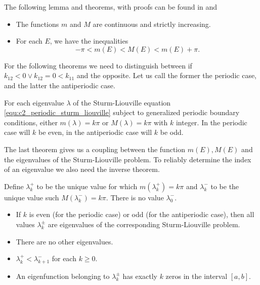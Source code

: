 The following lemma and theorems, with proofs can be found in \cite{binding_prufer_2012} and \cite{binding_prufer_2013a}
\begin{lemma}\label{lem:c2_periodic_m_inequality}\hfill
    \begin{itemize}
        \item The functions $m$ and $M$ are continuous and strictly increasing.
        \item For each $E$, we have the inequalities
              $$
                  -\pi < m(E) < M(E) < m(E) + \pi\text{.}
              $$
    \end{itemize}
\end{lemma}

For the following theorems we need to distinguish between if $k_{12} < 0 \lor k_{12} = 0 < k_{11}$ and the opposite. Let us call the former the periodic case, and the latter the antiperiodic case.

\begin{theorem}
    For each eigenvalue $\lambda$ of the Sturm-Liouville equation \eqref{equ:c2_periodic_sturm_liouville} subject to generalized periodic boundary conditions, either $m(\lambda) = k\pi$ or $M(\lambda) = k\pi$ with $k$ integer. In the periodic case will $k$ be even, in the antiperiodic case will $k$ be odd.
\end{theorem}

The last theorem gives us a coupling between the function $m(E), M(E)$ and the eigenvalues of the Sturm-Liouville problem. To reliably determine the index of an eigenvalue we also need the inverse theorem.

\begin{theorem}\label{the:c2_prufer_periodic_index}
    Define $\lambda_k^{+}$ to be the unique value for which $m(\lambda_k^{+}) = k\pi$ and $\lambda_k^{-}$ to be the unique value such $M(\lambda_k^{-}) = k\pi$. There is no value $\lambda_0^{-}$.
    \begin{itemize}
        \item If $k$ is even (for the periodic case) or odd (for the antiperiodic case), then all values $\lambda^{\pm}_k$ are eigenvalues of the corresponding Sturm-Liouville problem.
        \item There are no other eigenvalues.
        \item $\lambda_k^{+} < \lambda_{k+1}^{-}$ for each $k \geq 0$.
        \item An eigenfunction belonging to $\lambda_k^{\pm}$ has exactly $k$ zeros in the interval $\left[a, b\right]$.
    \end{itemize}
\end{theorem}

